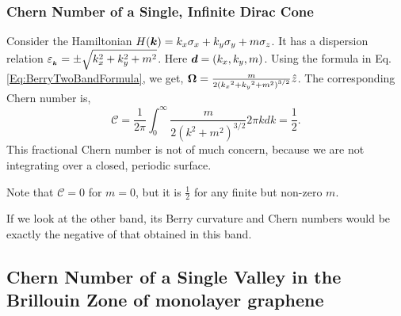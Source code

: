 \documentclass{report}
\renewcommand\vec[1]{\ensuremath\boldsymbol{#1}} %
\begin{document}
\subsubsection{Chern Number of a Single, Infinite Dirac Cone}
Consider the Hamiltonian $H(\vec{k}) = k_x \sigma_x + k_y \sigma_y + m \sigma_z$. It has a dispersion relation $\varepsilon_{_{\vec{k}}} = \pm \sqrt{k_x^2 + k_y^2 + m^2}$. Here $\vec{d} = (k_x, k_y, m)$. Using the formula in Eq. \eqref{Eq:BerryTwoBandFormula}, we get, $\vec{\Omega} = \frac{m}{2\left({k_x}^{2}+{k_y}^{2}+m^{2}\right)^{3 / 2}} \hat{z}$.
The corresponding Chern number is, $$\mathcal{C} = \frac{1}{2\pi} \int_{0}^{\infty} \frac{m}{2\left(k^2+m^{2}\right)^{3 / 2}} 2 \pi k dk = \frac{1}{2}.$$
This fractional Chern number is not of much concern, because we are not integrating over a closed, periodic surface.

Note that $\mathcal{C} = 0$ for $m = 0$, but it is $\frac{1}{2}$ for any finite but non-zero $m$.

If we look at the other band, its Berry curvature and Chern numbers would be exactly the negative of that obtained in this band.
\subsection{Chern Number of a Single Valley in the Brillouin Zone of monolayer graphene}
\end{document}
